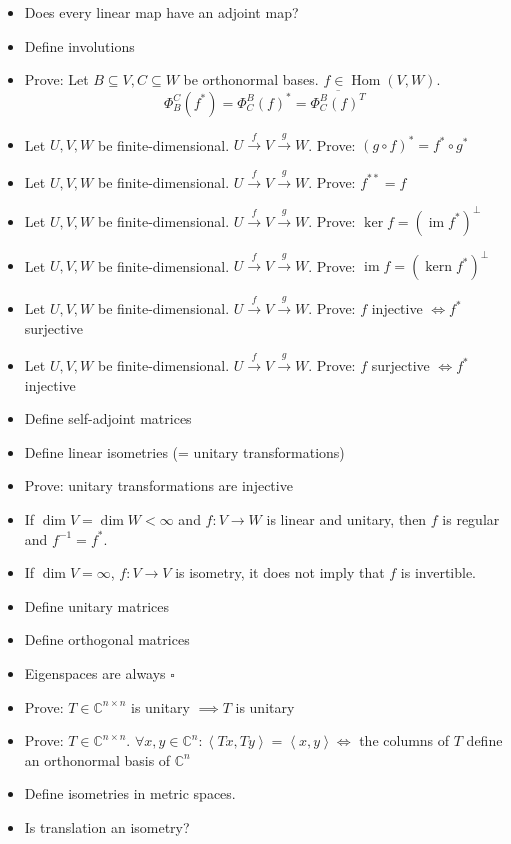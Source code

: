 \documentclass[a4paper]{article}
\newcommand{\ip}[2]{\left\langle#1,#2\right\rangle} %
\DeclareMathOperator{\im}{im}
\DeclareMathOperator{\ke}{kern}
\begin{document}
\begin{itemize}
  \item Does every linear map have an adjoint map?
  \item Define involutions
  \item Prove: Let $B \subseteq V, C \subseteq W$ be orthonormal bases. $f \in \operatorname{Hom}(V, W)$.
    \[ \Phi_B^C(f^*) = \Phi_C^B(f)^* = \overline{\Phi_C^B(f)^T} \]
  \item Let $U, V, W$ be finite-dimensional. $U \xrightarrow f V \xrightarrow g W$. Prove: $(g \circ f)^* = f^* \circ g^*$
  \item Let $U, V, W$ be finite-dimensional. $U \xrightarrow f V \xrightarrow g W$. Prove: $f^{**} = f$
  \item Let $U, V, W$ be finite-dimensional. $U \xrightarrow f V \xrightarrow g W$. Prove: $\ker{f} = (\im{f^*})^\bot$
  \item Let $U, V, W$ be finite-dimensional. $U \xrightarrow f V \xrightarrow g W$. Prove: $\im{f} = (\ke{f^*})^\bot$
  \item Let $U, V, W$ be finite-dimensional. $U \xrightarrow f V \xrightarrow g W$. Prove: $f$ injective $\iff f^*$ surjective
  \item Let $U, V, W$ be finite-dimensional. $U \xrightarrow f V \xrightarrow g W$. Prove: $f$ surjective $\iff f^*$ injective
  \item Define self-adjoint matrices
  \item Define linear isometries (= unitary transformations)
  \item Prove: unitary transformations are injective
  \item If $\dim{V} = \dim{W} < \infty$ and $f: V \to W$ is linear and unitary, then $f$ is regular and $f^{-1} = f^*$.
  \item If $\dim{V} = \infty$, $f: V \to V$ is isometry, it does not imply that $f$ is invertible.
  \item Define unitary matrices
  \item Define orthogonal matrices
  \item Eigenspaces are always $\square{}$
  \item Prove: $T \in \mathbb C^{n \times n}$ is unitary $\implies T$ is unitary
  \item Prove: $T \in \mathbb C^{n \times n}$. $\forall x,y \in \mathbb C^n: \ip{Tx}{Ty} = \ip xy \iff$ the columns of $T$ define an orthonormal basis of $\mathbb C^n$
  \item Define isometries in metric spaces.
  \item Is translation an isometry?

\end{itemize}
\end{document}
